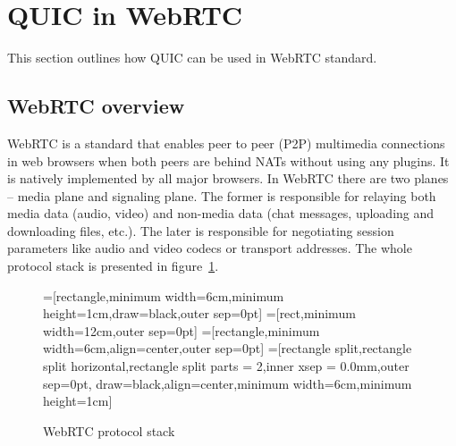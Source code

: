 \section{QUIC in WebRTC}
\label{sec:quic-in-webrtc}
This section outlines how QUIC can be used in WebRTC standard.

\subsection{WebRTC overview}
\label{subsec:webrtc-overview}
WebRTC is a standard that enables peer to peer (P2P) multimedia connections in web browsers when both peers are behind NATs without using any plugins.
It is natively implemented by all major browsers.
In WebRTC there are two planes -- media plane and signaling plane.
The former is responsible for relaying both media data (audio, video) and non-media data (chat messages, uploading and downloading files, etc.).
The later is responsible for negotiating session parameters like audio and video codecs or transport addresses.
The whole protocol stack is presented in figure~\ref{fig:webrtc-stack}.

\begin{figure}
    \centering
    =[rectangle,minimum width=6cm,minimum height=1cm,draw=black,outer sep=0pt]
    =[rect,minimum width=12cm,outer sep=0pt]
    =[rectangle,minimum width=6cm,align=center,outer sep=0pt]
    =[rectangle split,rectangle split horizontal,rectangle split parts = 2,inner xsep = 0.0mm,outer sep=0pt,
    draw=black,align=center,minimum width=6cm,minimum height=1cm]
    \caption{WebRTC protocol stack}
    \label{fig:webrtc-stack}
\end{figure}

